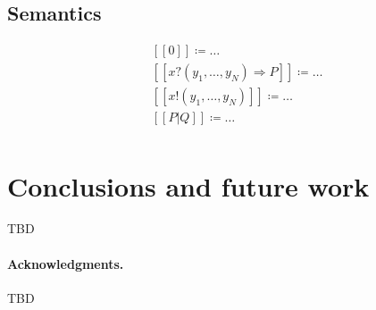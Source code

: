 \documentclass[]{acm_proc_article-sp}
\newcommand{\ldb}{[\![}
\newcommand{\rdb}{]\!]}
\newcommand{\id}[1]{\texttt{#1}}
\newcommand{\pzero}{\mathbin{0}}
\newcommand{\juxtap}{\mathbin{\id{|}}}
\newcommand{\binpar}[2]{#1 \juxtap #2}
\newcommand{\meaningof}[1]{\ldb #1 \rdb}
\newcommand{\defneqls}{\coloneqq}
\numberwithin{equation}{subsection}
\begin{document}
\subsection{Semantics}
\begin{equation*}
  \begin{aligned}
    & \meaningof{\pzero} \defneqls \ldots \\
    & \meaningof{{x}{?}{( y_1, \ldots, y_N )} \Rightarrow {P}} \defneqls \ldots \\
    & \meaningof{{x}{!}{( y_1, \ldots, y_N )}} \defneqls \ldots \\
    & \meaningof{\binpar{P}{Q}} \defneqls \ldots \\
  \end{aligned}
\end{equation*}

\section{Conclusions and future work}

TBD \\

\paragraph{Acknowledgments.}
TBD \\







\end{document}
